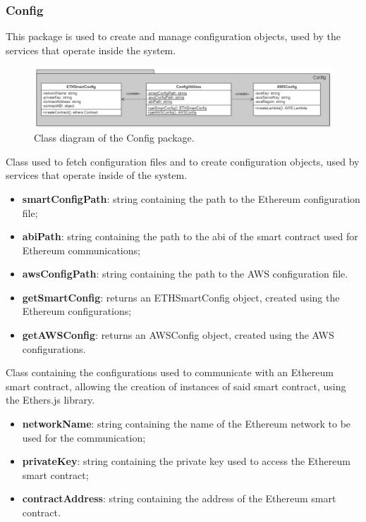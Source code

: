 	\subsubsection{Config}
	This package is used to create and manage configuration objects, used by the services that operate inside the system.
	\begin{figure} [h!]
		\centering
		\includegraphics[width=1\linewidth]{diagrammi/etherless-server/Config}
		\caption{Class diagram of the Config package.}
	\end{figure}
	Class used to fetch configuration files and to create configuration objects, used by services that operate inside of the system.
	\begin{itemize}
		\item \textbf{smartConfigPath}: string containing the path to the Ethereum configuration file;
		\item \textbf{abiPath}: string containing the path to the abi of the smart contract used for Ethereum communications;
		\item \textbf{awsConfigPath}: string containing the path to the AWS configuration file.
	\end{itemize}
	\begin{itemize}
		\item \textbf{getSmartConfig}: returns an ETHSmartConfig object, created using the Ethereum configurations;
		\item \textbf{getAWSConfig}: returns an AWSConfig object, created using the AWS configurations.
	\end{itemize}
	Class containing the configurations used to communicate with an Ethereum smart contract, allowing the creation of instances of said smart contract, using the Ethers.js library.
	\begin{itemize}
		\item \textbf{networkName}: string containing the name of the Ethereum network to be used for the communication;
		\item \textbf{privateKey}: string containing the private key used to access the Ethereum smart contract;
		\item \textbf{contractAddress}: string containing the address of the Ethereum smart contract.
	\end{itemize}

